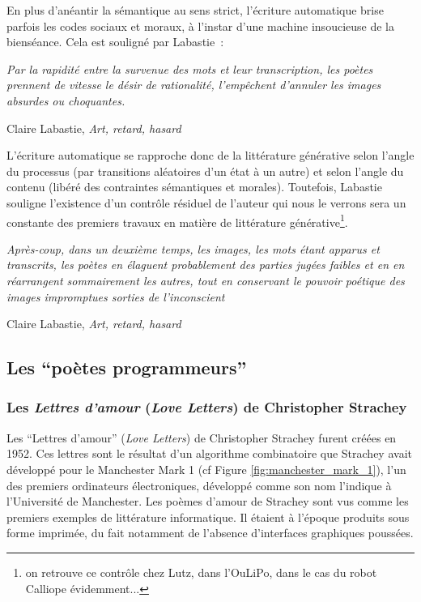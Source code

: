 \documentclass{article}
\newenvironment{citationbox}
{\begin{center}
		\begin{minipage}{.8\textwidth}
		}
		{
		\end{minipage}	
\end{center}
}
\begin{document}
				En plus d'anéantir la sémantique au sens strict, l'écriture automatique brise parfois les codes sociaux et moraux, à l'instar d'une machine insoucieuse de la bienséance. Cela est souligné par Labastie~:
				\begin{citationbox}
					\textit{Par la rapidité entre la survenue des mots et leur transcription, les poètes prennent de vitesse le désir de rationalité, l'empêchent d'annuler les images absurdes ou choquantes.}
					\begin{flushright}
						Claire Labastie, \textit{Art, retard, hasard}\cite{labastie2016}
					\end{flushright}
				\end{citationbox}
				
				L'écriture automatique se rapproche donc de la littérature générative selon l'angle du processus (par transitions aléatoires d'un état à un autre) et selon l'angle du contenu (libéré des contraintes sémantiques et morales). Toutefois, Labastie souligne l'existence d'un contrôle résiduel de l'auteur qui nous le verrons sera un constante des premiers travaux en matière de littérature générative\footnote{on retrouve ce contrôle chez Lutz, dans l'OuLiPo, dans le cas du robot Calliope évidemment...}.
				\begin{citationbox}
					\textit{Après-coup, dans un deuxième temps, les images, les mots étant apparus et transcrits, les poètes en élaguent probablement des parties jugées faibles et en en réarrangent sommairement les autres, tout en conservant le pouvoir poétique des images impromptues sorties de l'inconscient}
					\begin{flushright}
						Claire Labastie, \textit{Art, retard, hasard}\cite{labastie2016}
					\end{flushright}
				\end{citationbox}
				
		\subsection{Les ``poètes programmeurs''}
			\subsubsection{Les \textit{Lettres d'amour} (\textit{Love Letters}) de Christopher Strachey}
				Les ``Lettres d'amour'' (\textit{Love Letters}) de Christopher Strachey furent créées en 1952. Ces lettres sont le résultat d'un algorithme combinatoire que Strachey avait développé pour le Manchester Mark 1 (cf Figure \ref{fig:manchester_mark_1}), l'un des premiers ordinateurs électroniques, développé comme son nom l'indique à l'Université de Manchester. Les poèmes d'amour de Strachey sont vus comme les premiers exemples de littérature informatique. Il étaient à l'époque produits sous forme imprimée, du fait notamment de l'absence d'interfaces graphiques poussées.
				
\end{document}
